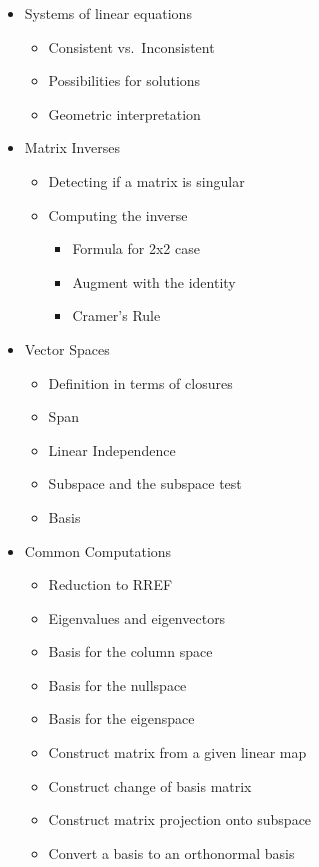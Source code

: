 \begin{itemize}
\tightlist
\item
  Systems of linear equations

  \begin{itemize}
  \tightlist
  \item
    Consistent vs.~Inconsistent
  \item
    Possibilities for solutions
  \item
    Geometric interpretation
  \end{itemize}
\item
  Matrix Inverses

  \begin{itemize}
  \tightlist
  \item
    Detecting if a matrix is singular
  \item
    Computing the inverse

    \begin{itemize}
    \tightlist
    \item
      Formula for 2x2 case
    \item
      Augment with the identity
    \item
      Cramer's Rule
    \end{itemize}
  \end{itemize}
\item
  Vector Spaces

  \begin{itemize}
  \tightlist
  \item
    Definition in terms of closures
  \item
    Span
  \item
    Linear Independence
  \item
    Subspace and the subspace test
  \item
    Basis
  \end{itemize}
\item
  Common Computations

  \begin{itemize}
  \tightlist
  \item
    Reduction to RREF
  \item
    Eigenvalues and eigenvectors
  \item
    Basis for the column space
  \item
    Basis for the nullspace
  \item
    Basis for the eigenspace
  \item
    Construct matrix from a given linear map
  \item
    Construct change of basis matrix
  \item
    Construct matrix projection onto subspace
  \item
    Convert a basis to an orthonormal basis
  \end{itemize}
\end{itemize}

